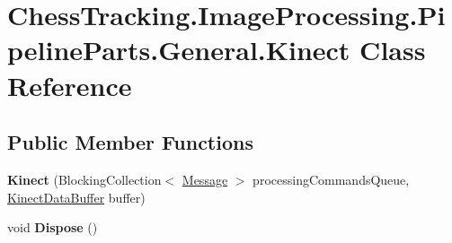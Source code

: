 \hypertarget{class_chess_tracking_1_1_image_processing_1_1_pipeline_parts_1_1_general_1_1_kinect}{}\section{Chess\+Tracking.\+Image\+Processing.\+Pipeline\+Parts.\+General.\+Kinect Class Reference}
\label{class_chess_tracking_1_1_image_processing_1_1_pipeline_parts_1_1_general_1_1_kinect}
\subsection*{Public Member Functions}
\begin{DoxyCompactItemize}
\item 
\mbox{\label{class_chess_tracking_1_1_image_processing_1_1_pipeline_parts_1_1_general_1_1_kinect_ab8f55af2a4cb716de1d1392dcf6d3dae}} 
{\bfseries Kinect} (Blocking\+Collection$<$ \mbox{\hyperlink{class_chess_tracking_1_1_multithreading_messages_1_1_message}{Message}} $>$ processing\+Commands\+Queue, \mbox{\hyperlink{class_chess_tracking_1_1_image_processing_1_1_pipeline_data_1_1_kinect_data_buffer}{Kinect\+Data\+Buffer}} buffer)
\item 
\mbox{\label{class_chess_tracking_1_1_image_processing_1_1_pipeline_parts_1_1_general_1_1_kinect_aa5c7d320faa3a27f4bcb8939bec76cc5}} 
void {\bfseries Dispose} ()
\end{DoxyCompactItemize}
